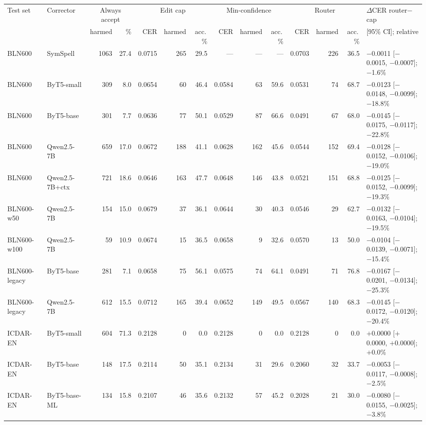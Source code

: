 \begin{tabular}{llrrrrrrrrrrrl}
\toprule
Test set & Corrector & \multicolumn{2}{c}{Always accept} & \multicolumn{3}{c}{Edit cap} & \multicolumn{3}{c}{Min-confidence} & \multicolumn{3}{c}{Router} & $\Delta$CER router$-$cap \\
 & & harmed & \% & CER & harmed & acc.\,\% & CER & harmed & acc.\,\% & CER & harmed & acc.\,\% & [95\% CI]; relative \\
\midrule
BLN600 & SymSpell & 1063 & 27.4 & 0.0715 & 265 & 29.5 & — & — & — & 0.0703 & 226 & 36.5 & $-$0.0011 [$-$0.0015, $-$0.0007]; $-$1.6\% \\
BLN600 & ByT5-small & 309 & 8.0 & 0.0654 & 60 & 46.4 & 0.0584 & 63 & 59.6 & 0.0531 & 74 & 68.7 & $-$0.0123 [$-$0.0148, $-$0.0099]; $-$18.8\% \\
BLN600 & ByT5-base & 301 & 7.7 & 0.0636 & 77 & 50.1 & 0.0529 & 87 & 66.6 & 0.0491 & 67 & 68.0 & $-$0.0145 [$-$0.0175, $-$0.0117]; $-$22.8\% \\
BLN600 & Qwen2.5-7B & 659 & 17.0 & 0.0672 & 188 & 41.1 & 0.0628 & 162 & 45.6 & 0.0544 & 152 & 69.4 & $-$0.0128 [$-$0.0152, $-$0.0106]; $-$19.0\% \\
BLN600 & Qwen2.5-7B+ctx & 721 & 18.6 & 0.0646 & 163 & 47.7 & 0.0648 & 146 & 43.8 & 0.0521 & 151 & 68.8 & $-$0.0125 [$-$0.0152, $-$0.0099]; $-$19.3\% \\
BLN600-w50 & Qwen2.5-7B & 154 & 15.0 & 0.0679 & 37 & 36.1 & 0.0644 & 30 & 40.3 & 0.0546 & 29 & 62.7 & $-$0.0132 [$-$0.0163, $-$0.0104]; $-$19.5\% \\
BLN600-w100 & Qwen2.5-7B & 59 & 10.9 & 0.0674 & 15 & 36.5 & 0.0658 & 9 & 32.6 & 0.0570 & 13 & 50.0 & $-$0.0104 [$-$0.0139, $-$0.0071]; $-$15.4\% \\
BLN600-legacy & ByT5-base & 281 & 7.1 & 0.0658 & 75 & 56.1 & 0.0575 & 74 & 64.1 & 0.0491 & 71 & 76.8 & $-$0.0167 [$-$0.0201, $-$0.0134]; $-$25.3\% \\
BLN600-legacy & Qwen2.5-7B & 612 & 15.5 & 0.0712 & 165 & 39.4 & 0.0652 & 149 & 49.5 & 0.0567 & 140 & 68.3 & $-$0.0145 [$-$0.0172, $-$0.0120]; $-$20.4\% \\
ICDAR-EN & ByT5-small & 604 & 71.3 & 0.2128 & 0 & 0.0 & 0.2128 & 0 & 0.0 & 0.2128 & 0 & 0.0 & $+$0.0000 [$+$0.0000, $+$0.0000]; $+$0.0\% \\
ICDAR-EN & ByT5-base & 148 & 17.5 & 0.2114 & 50 & 35.1 & 0.2134 & 31 & 29.6 & 0.2060 & 32 & 33.7 & $-$0.0053 [$-$0.0117, $-$0.0008]; $-$2.5\% \\
ICDAR-EN & ByT5-base-ML & 134 & 15.8 & 0.2107 & 46 & 35.6 & 0.2132 & 57 & 45.2 & 0.2028 & 21 & 30.0 & $-$0.0080 [$-$0.0155, $-$0.0025]; $-$3.8\% \\

\end{tabular}
